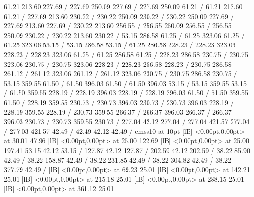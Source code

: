 { 61.21 213.60 227.69 /
 227.69 250.09 227.69 /
 227.69 250.09 61.21 /
 61.21 213.60 61.21 /
\setsolid
{} 227.69 213.60 230.22 /
 230.22 250.09 230.22 /
 230.22 250.09 227.69 /
 227.69 213.60 227.69 /
\setsolid
{} 230.22 213.60 256.55 /
 256.55 250.09 256.55 /
 256.55 250.09 230.22 /
 230.22 213.60 230.22 /
\setsolid
{} 53.15 286.58 61.25 /
 61.25 323.06 61.25 /
 61.25 323.06 53.15 /
 53.15 286.58 53.15 /
\setsolid
{} 61.25 286.58 228.23 /
 228.23 323.06 228.23 /
 228.23 323.06 61.25 /
 61.25 286.58 61.25 /
\setsolid
{} 228.23 286.58 230.75 /
 230.75 323.06 230.75 /
 230.75 323.06 228.23 /
 228.23 286.58 228.23 /
\setsolid
{} 230.75 286.58 261.12 /
 261.12 323.06 261.12 /
 261.12 323.06 230.75 /
 230.75 286.58 230.75 /
\setsolid
{} 53.15 359.55 61.50 /
 61.50 396.03 61.50 /
 61.50 396.03 53.15 /
 53.15 359.55 53.15 /
\setsolid
{} 61.50 359.55 228.19 /
 228.19 396.03 228.19 /
 228.19 396.03 61.50 /
 61.50 359.55 61.50 /
\setsolid
{} 228.19 359.55 230.73 /
 230.73 396.03 230.73 /
 230.73 396.03 228.19 /
 228.19 359.55 228.19 /
\setsolid
{} 230.73 359.55 266.37 /
 266.37 396.03 266.37 /
 266.37 396.03 230.73 /
 230.73 359.55 230.73 /
\setsolid
{} 277.04 42.12 277.04 /
 277.04 421.57 277.04 /
 277.03 421.57 42.49 /
 42.49 42.12 42.49 /
\font\picfont cmss10 at 10pt\picfont
{}  [lB] <0.00pt,0.00pt> at 30.01 47.96
  [lB] <0.00pt,0.00pt> at 25.00 122.69
  [lB] <0.00pt,0.00pt> at 25.00 197.41
\setsolid
{} 53.15 42.12 53.15 /
\setsolid
{} 127.87 42.12 127.87 /
\setsolid
{} 202.59 42.12 202.59 /
\setsolid
{} 38.22 85.90 42.49 /
\setsolid
{} 38.22 158.87 42.49 /
\setsolid
{} 38.22 231.85 42.49 /
\setsolid
{} 38.22 304.82 42.49 /
\setsolid
{} 38.22 377.79 42.49 /
  [lB] <0.00pt,0.00pt> at 69.23 25.01
  [lB] <0.00pt,0.00pt> at 142.21 25.01
  [lB] <0.00pt,0.00pt> at 215.18 25.01
  [lB] <0.00pt,0.00pt> at 288.15 25.01
  [lB] <0.00pt,0.00pt> at 361.12 25.01
}
